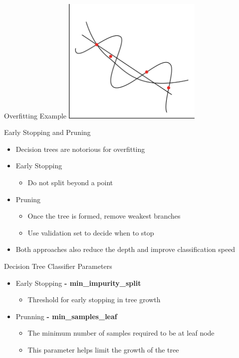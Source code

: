\documentclass[aspectratio=169, 14pt]{beamer}
\begin{document}
\begin{frame}{Overfitting Example}
\centering
	\includegraphics[width=0.5\textwidth, height=0.7\textheight]{DT_OF_Images/dtree2_23.png}

\end{frame}


\begin{frame}[t]{Early Stopping and Pruning}
	\vspace{-0.2cm}	\begin{itemize}
		\item Decision trees are notorious for overfitting
		\item Early Stopping
			\begin{itemize}
				\item Do not split beyond a point
			\end{itemize}
		\item Pruning
			\begin{itemize}
				\item Once the tree is formed, remove weakest branches
				\item Use validation set to decide when to stop
			\end{itemize}
				\item Both approaches also reduce the depth and improve  classification speed
	\end{itemize}

\end{frame}


\begin{frame}{Decision Tree Classifier Parameters}
	\begin{itemize}
		\item Early Stopping \textbf{- min\_impurity\_split}
			\begin{itemize}
				\item Threshold for early stopping in tree growth
			\end{itemize}
		\item Prunning \textbf{- min\_samples\_leaf}
			\begin{itemize}
				\item The minimum number of samples required to be at leaf node
				\item This parameter helps limit the growth of the tree
			\end{itemize}
	\end{itemize}
\end{frame}
\end{document}
